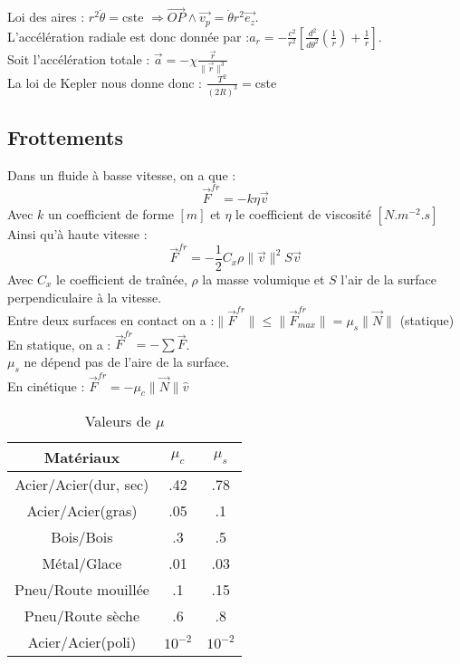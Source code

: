 \documentclass[../main.tex]{subfiles}
\begin{document}
Loi des aires : $r^2 \dot{\theta} = $cste $\Rightarrow \vec{OP} \wedge \vec{v_p} = \dot{\theta} r^2 \vec{e_z}$.\\
L'accélération radiale est donc donnée par :$a_r = -\frac{c^2}{r^2} [\frac{d^2}{d \theta^2} (\frac{1}{r}) + \frac{1}{r}]$. \\
Soit l'accélération totale : $\vec{a} = -\chi \frac{\vec{r}}{\parallel \vec{r}\parallel^3}$\\
La loi de Kepler nous donne donc : $\frac{T^2}{(2R)^3} =$cste\\

\subsection{Frottements}
Dans un fluide à basse vitesse, on a que :\\
\begin{equation}
    \vec{F}^{fr} = -k \eta \vec{v}
\end{equation}
Avec $k$ un coefficient de forme $[m]$ et $\eta$ le coefficient de viscosité $[N.m^{-2}.s]$\\
Ainsi qu'à haute vitesse :\\
\begin{equation}
    \vec{F}^{fr} = -\frac{1}{2}C_x \rho \parallel\vec{v}\parallel^2 S \vec{v}
\end{equation}
Avec $C_x$ le coefficient de traînée, $\rho$ la masse volumique et $S$ l'air de la surface perpendiculaire à la vitesse.\\

Entre deux surfaces en contact on a :$\parallel \vec{F}^{fr} \parallel \leq \parallel \vec{F}^{fr}_{max} \parallel = \mu_s \parallel \vec{N} \parallel$ (statique)\\
En statique, on a : $\vec{F}^{fr} = -\sum \vec{F}$.\\
\warning $\mu_s$ ne dépend pas de l'aire de la surface.\\
En cinétique : $\vec{F}^{fr} = - \mu_c \parallel \vec{N} \parallel \hat{v}$\\

\begin{table}[hbt!]
    \centering
    \begin{tabular}{c|c|c}
        Matériaux & $\mu_c$ & $\mu_s$\\
        \hline
        Acier/Acier(dur, sec) & .42 & .78\\
        Acier/Acier(gras) & .05 & .1\\
        Bois/Bois & .3 & .5\\
        Métal/Glace & .01 & .03\\
        Pneu/Route mouillée & .1 & .15\\
        Pneu/Route sèche & .6 & .8\\
        Acier/Acier(poli) & $10^{-2}$ & $10^{-2}$\\
    \end{tabular}
    \caption{Valeurs de $\mu$}
    
\end{table}
\end{document}
